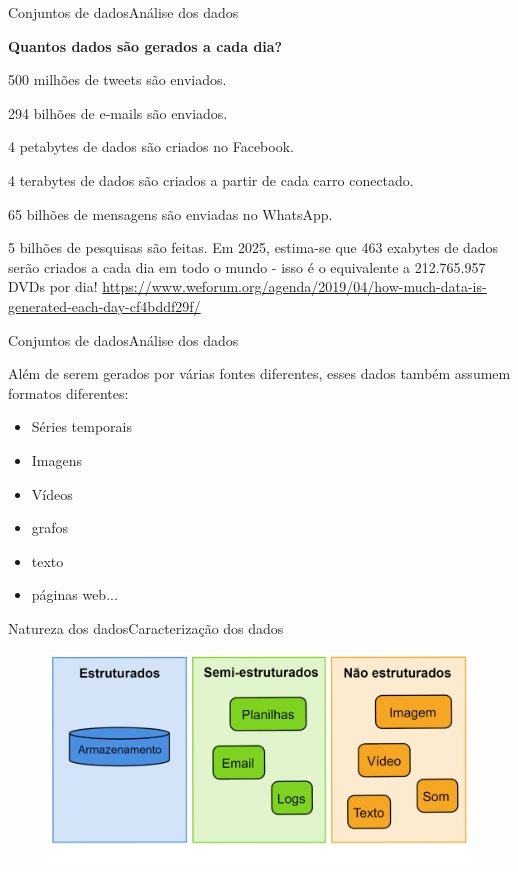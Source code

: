 \documentclass[t]{beamer}
\begin{document}

\begin{ftst}{Conjuntos de dados}{Análise dos dados}

\textbf{Quantos dados são gerados a cada dia?}
\vone
\item 500 milhões de tweets são enviados.

294 bilhões de e-mails são enviados.

4 petabytes de dados são criados no Facebook.

4 terabytes de dados são criados a partir de cada carro conectado.

65 bilhões de mensagens são enviadas no WhatsApp.

5 bilhões de pesquisas são feitas.
\vone
Em 2025, estima-se que 463 exabytes de dados serão criados a cada dia em todo o mundo - isso é o equivalente a 212.765.957 DVDs por dia!
\vone
\vone
\vone
\scriptsize
\href{https://www.weforum.org/agenda/2019/04/how-much-data-is-generated-each-day-cf4bddf29f/}{https://www.weforum.org/agenda/2019/04/how-much-data-is-generated-each-day-cf4bddf29f/}
\end{ftst}


\begin{ftst}{Conjuntos de dados}{Análise dos dados}

Além de serem gerados por várias fontes diferentes, esses dados também assumem formatos diferentes:
\vone
\begin{itemize}
    \item Séries temporais
    \item Imagens
    \item Vídeos
    \item grafos
    \item texto
    \item páginas web...
\end{itemize}

\vone

\centering 

\end{ftst}



\begin{ftst}{Natureza dos dados}{Caracterização dos dados}
\vone
\begin{figure}
    \centering
    \includegraphics[scale=0.2]{Figuras/naturezadata.png}
\end{figure}


\end{ftst}
\end{document}
